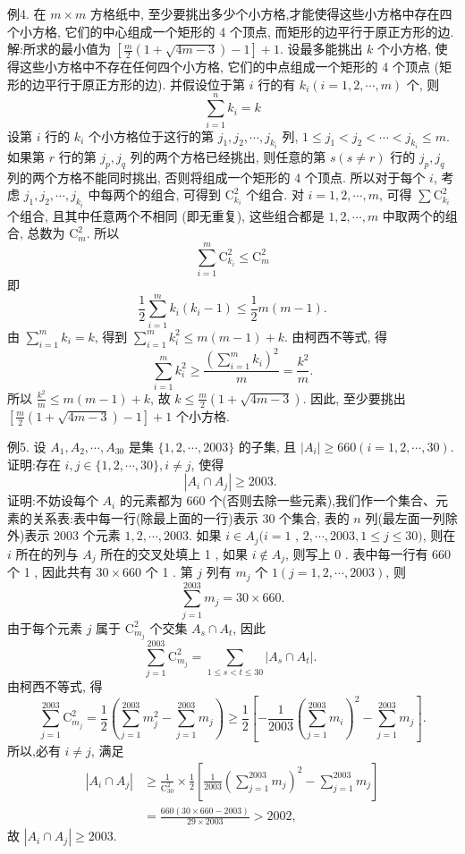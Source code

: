 例4. 在 $m \times m$ 方格纸中, 至少要挑出多少个小方格,才能使得这些小方格中存在四个小方格, 它们的中心组成一个矩形的 4 个顶点, 而矩形的边平行于原正方形的边.
解:所求的最小值为 $\left[\frac{m}{2}(1+\sqrt{4 m-3})-1\right]+1$. 设最多能挑出 $k$ 个小方格, 使得这些小方格中不存在任何四个小方格, 它们的中点组成一个矩形的 4 个顶点 (矩形的边平行于原正方形的边). 并假设位于第 $i$ 行的有 $k_i(i= 1,2, \cdots, m)$ 个, 则
$$
\sum_{i=1}^n k_i=k
$$
设第 $i$ 行的 $k_i$ 个小方格位于这行的第 $j_1, j_2, \cdots, j_{k_i}$ 列, $1 \leqslant j_1<j_2< \cdots<j_{k_i} \leqslant m$. 如果第 $r$ 行的第 $j_p, j_q$ 列的两个方格已经挑出, 则任意的第 $s (s \neq r)$ 行的 $j_p, j_q$ 列的两个方格不能同时挑出, 否则将组成一个矩形的 4 个顶点.
所以对于每个 $i$, 考虑 $j_1, j_2, \cdots, j_{k_i}$ 中每两个的组合, 可得到 $\mathrm{C}_{k_i}^2$ 个组合.
对 $i=1,2, \cdots, m$, 可得 $\sum \mathrm{C}_{k_i}^2$ 个组合, 且其中任意两个不相同 (即无重复), 这些组合都是 $1,2, \cdots, m$ 中取两个的组合, 总数为 $\mathrm{C}_m^2$. 所以
$$
\sum_{i=1}^m \mathrm{C}_{k_i}^2 \leqslant \mathrm{C}_m^2
$$
即
$$
\frac{1}{2} \sum_{i=1}^m k_i\left(k_i-1\right) \leqslant \frac{1}{2} m(m-1) .
$$
由 $\sum_{i=1}^m k_i=k$, 得到 $\sum_{i=1}^m k_i^2 \leqslant m(m-1)+k$. 由柯西不等式, 得
$$
\sum_{i=1}^m k_i^2 \geqslant \frac{\left(\sum_{i=1}^m k_i\right)^2}{m}=\frac{k^2}{m} .
$$
所以 $\frac{k^2}{m} \leqslant m(m-1)+k$, 故 $k \leqslant \frac{m}{2}(1+\sqrt{4 m-3})$.
因此, 至少要挑出 $\left[\frac{m}{2}(1+\sqrt{4 m-3})-1\right]+1$ 个小方格.



例5. 设 $A_1, A_2, \cdots, A_{30}$ 是集 $\{1,2, \cdots, 2003\}$ 的子集, 且 $\left|A_i\right| \geqslant 660 (i=1,2, \cdots, 30)$. 证明:存在 $i, j \in\{1,2, \cdots, 30\}, i \neq j$, 使得
$$
\left|A_i \cap A_j\right| \geqslant 2003 \text {. }
$$
证明:不妨设每个 $A_i$ 的元素都为 660 个(否则去除一些元素),我们作一个集合、元素的关系表:表中每一行(除最上面的一行)表示 30 个集合, 表的 $n$ 列(最左面一列除外)表示 2003 个元素 $1,2, \cdots, 2003$. 如果 $i \in A_j(i=1$ , $2, \cdots, 2003,1 \leqslant j \leqslant 30)$, 则在 $i$ 所在的列与 $A_j$ 所在的交叉处填上 1 , 如果 $i \notin A_j$, 则写上 0 . 表中每一行有 660 个 1 , 因此共有 $30 \times 660$ 个 1 . 第 $j$ 列有 $m_j$ 个 $1(j=1,2, \cdots, 2003)$, 则
$$
\sum_{j=1}^{2003} m_j=30 \times 660 .
$$
由于每个元素 $j$ 属于 $\mathrm{C}_{m_j}^2$ 个交集 $A_s \cap A_t$, 因此
$$
\sum_{j=1}^{2003} \mathrm{C}_{m_j}^2=\sum_{1 \leqslant s<t \leqslant 30}\left|A_s \cap A_t\right| \text {. }
$$
由柯西不等式, 得
$$
\sum_{j=1}^{2003} \mathrm{C}_{m_j}^2=\frac{1}{2}\left(\sum_{j=1}^{2003} m_j^2-\sum_{j=1}^{2003} m_j\right) \geqslant \frac{1}{2}\left[-\frac{1}{2003}\left(\sum_{j=1}^{2003} m_i\right)^2-\sum_{j=1}^{2003} m_j\right] .
$$
所以,必有 $i \neq j$, 满足
$$
\begin{aligned}
\left|A_i \cap A_j\right| & \geqslant \frac{1}{\mathrm{C}_{30}^2} \times \frac{1}{2}\left[\frac{1}{2003}\left(\sum_{j=1}^{2003} m_j\right)^2-\sum_{j=1}^{2003} m_j\right] \\
& =\frac{660(30 \times 660-2003)}{29 \times 2003}>2002,
\end{aligned}
$$
故 $\left|A_i \cap A_j\right| \geqslant 2003$.



